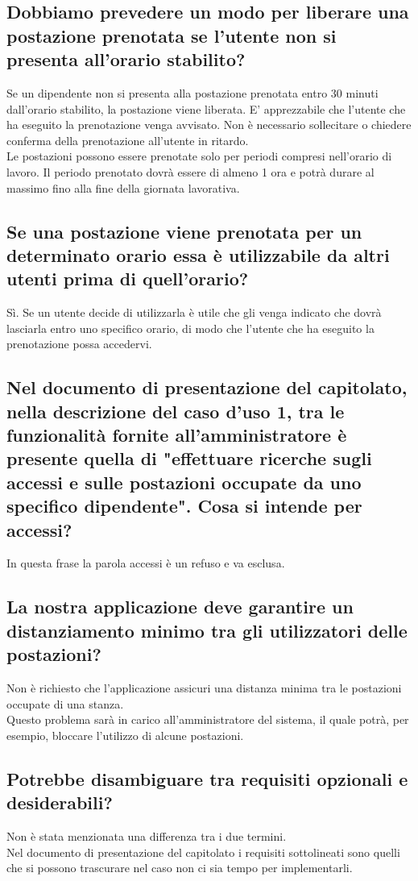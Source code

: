 \subsection*{Dobbiamo prevedere un modo per liberare una postazione prenotata se l'utente non si presenta all'orario stabilito?}
Se un dipendente non si presenta alla postazione prenotata entro 30 minuti dall'orario stabilito, la postazione viene liberata. E' apprezzabile che l'utente che ha eseguito la prenotazione venga avvisato. Non è necessario sollecitare o chiedere conferma della prenotazione all'utente in ritardo.\\
Le postazioni possono essere prenotate solo per periodi compresi nell'orario di lavoro.
Il periodo prenotato dovrà essere di almeno 1 ora e potrà durare al massimo fino alla fine della giornata lavorativa.\\


\subsection*{Se una postazione viene prenotata per un determinato orario essa è utilizzabile da altri utenti prima di quell'orario?}
Sì. Se un utente decide di utilizzarla è utile che gli venga indicato che dovrà lasciarla entro uno specifico orario, di modo che l'utente che ha eseguito la prenotazione possa accedervi.

\subsection*{Nel documento di presentazione del capitolato, nella descrizione del caso d'uso 1, tra le funzionalità fornite all'amministratore è presente quella di "effettuare ricerche sugli accessi e sulle postazioni occupate da uno specifico dipendente". Cosa si intende per accessi?}
In questa frase la parola accessi è un refuso e va esclusa.

\subsection*{La nostra applicazione deve garantire un distanziamento minimo tra gli utilizzatori delle postazioni?}			
Non è richiesto che l'applicazione assicuri una distanza minima tra le postazioni occupate di una stanza.\\
Questo problema sarà in carico all'amministratore del sistema, il quale potrà, per esempio, bloccare l'utilizzo di alcune postazioni.

\subsection*{Potrebbe disambiguare tra requisiti opzionali e desiderabili?}
Non è stata menzionata una differenza tra i due termini.\\
Nel documento di presentazione del capitolato i requisiti sottolineati sono quelli che si possono trascurare nel caso non ci sia tempo per implementarli.

